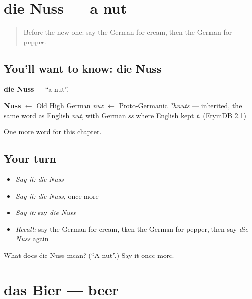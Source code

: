 \section[die Nuss]{die Nuss — a nut}

\label{lesson:GE-C75-nuss}



\begin{quote}
Before the new one: say the German for cream, then the German for pepper.
\end{quote}

\subsection*{You'll want to know: die Nuss}
\textbf{die Nuss} — \textquotedblleft{}a nut\textquotedblright{}.

\begin{cousinweb}
\textbf{Nuss} $\leftarrow$ Old High German \emph{nuz} $\leftarrow$ Proto-Germanic \emph{*hnuts} — inherited, the same word as English \emph{nut}, with German \emph{ss} where English kept \emph{t}. (EtymDB 2.1)
\end{cousinweb}

\begin{grammarlens}[title={What you've built}]
One more word for this chapter.
\end{grammarlens}

\subsection*{Your turn}
\begin{itemize}
\raggedright
  \item \emph{Say it:} \emph{die Nuss}
  \item \emph{Say it:} \emph{die Nuss}, once more
  \item \emph{Say it:} say \emph{die Nuss}
  \item \emph{Recall:} say the German for cream, then the German for pepper, then say \emph{die Nuss} again
\end{itemize}

\begin{tcolorbox}[breakable,colback=teal!4,colframe=teal!35!black,title={Before you move on}]
What does die Nuss mean? (\textquotedblleft{}A nut\textquotedblright{}.) Say it once more.
\end{tcolorbox}
\section[das Bier]{das Bier — beer}


